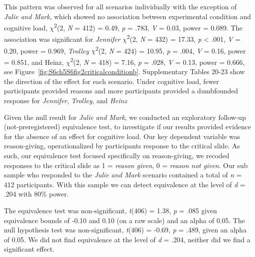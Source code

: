 \documentclass[
  man,floatsintext]{apa6}
\begin{document}
\newpage

This pattern was observed for all scenarios individually with the exception of \emph{Julie and Mark}, which showed no association between experimental condition and cognitive load, \(\chi\)\textsuperscript{2}(2, \emph{N} = 412) = 0.49, \emph{p} = .783, \emph{V} = 0.03, power = 0.089. The association was significant for \emph{Jennifer} \(\chi\)\textsuperscript{2}(2, \emph{N} = 432) = 17.33, \emph{p} \textless{} .001, \emph{V} = 0.20, power = 0.969, \emph{Trolley} \(\chi\)\textsuperscript{2}(2, \emph{N} = 424) = 10.95, \emph{p} = .004, \emph{V} = 0.16, power = 0.851, and Heinz, \(\chi\)\textsuperscript{2}(2, \emph{N} = 418) = 7.16, \emph{p} = .028, \emph{V} = 0.13, power = 0.666, see Figure~\ref{fig:S6ch5S6fig2criticalconditionb}. Supplementary Tables 20-23 show the direction of the effect for each scenario. Under cognitive load, fewer participants provided reasons and more participants provided a dumbfounded response for \emph{Jennifer}, \emph{Trolley}, and \emph{Heinz}

Given the null result for \emph{Julie and Mark}, we conducted an exploratory follow-up (not-preregistered) equivalence test, to investigate if our results provided evidence for the absence of an effect for cognitive load. Our key dependent variable was reason-giving, operationalized by participants response to the critical slide. As such, our equivalence test focused specifically on reason-giving, we recoded responses to the critical slide as 1 = \emph{reason given}, 0 = \emph{reason not given}. Our sub sample who responded to the \emph{Julie and Mark} scenario contained a total of \emph{n} = 412 participants. With this sample we can detect equivalence at the level of \emph{d} = .204 with 80\% power.

The equivalence test was non-significant, \emph{t}(406) = 1.38, \emph{p} = .085 given equivalence bounds of -0.10 and 0.10 (on a raw scale) and an alpha of 0.05. The null hypothesis test was non-significant, \emph{t}(406) = -0.69, \emph{p} = .489, given an alpha of 0.05. We did not find equivalence at the level of \emph{d} = .204, neither did we find a significant effect.
\end{document}
